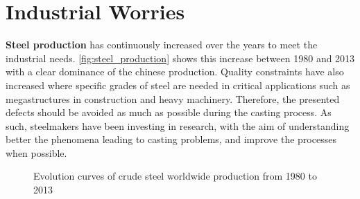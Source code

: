 \section*{Industrial Worries}
\textbf{Steel production} has continuously increased over the years to meet the industrial needs. \autoref{fig:steel_production} shows this increase between 1980 and 2013 with a 
clear dominance of the chinese production. Quality constraints have also increased where specific grades of steel are needed in critical applications such as megastructures
in construction and  heavy machinery. Therefore, the presented defects should be avoided as much as possible during the casting process. As such, steelmakers have been investing
in research, with the aim of understanding better the phenomena leading to casting problems, and improve the processes when possible.

\begin{figure}[!h]
\centering
{}
\caption{Evolution curves of crude steel worldwide production from 1980 to 2013}
\label{fig:steel_production}
\end{figure}

